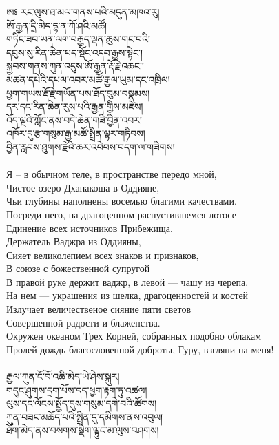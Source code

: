\ti
ཨཿ རང་ལུས་ཐ་མལ་གནས་པའི་མདུན་མཁའ་རུ།\\
ཨོ་རྒྱན་དྲི་མེད་དྷ་ན་ཀོ་ཤའི་མཚོ།\\
གཏིང་ཟབ་ཡན་ལག་བརྒྱད་ལྡན་ཆུས་གང་བའི།\\
དབུས་སུ་རིན་ཆེན་པད་སྡོང་འདབ་རྒྱས་སྟེང་།\\
སྐྱབས་གནས་ཀུན་འདུས་ཨོ་རྒྱན་རྡོ་རྗེ་འཆང་།\\
མཚན་དཔེའི་དཔལ་འབར་མཚོ་རྒྱལ་ཡུམ་དང་འཁྲིལ།\\
ཕྱག་གཡས་རྡོ་རྗེ་གཡོན་པས་ཐོད་བུམ་བསྣམས།\\
དར་དང་རིན་ཆེན་རུས་པའི་རྒྱན་གྱིས་མཛེས།\\
འོད་ལྔའི་ཀློང་ནས་བདེ་ཆེན་གཟི་བྱིན་འབར། \\
འཁོར་དུ་རྩ་གསུམ་རྒྱ་མཚོ་སྤྲིན་ལྟར་གཏིབས།\\
བྱིན་རླབས་ཐུགས་རྗེའི་ཆར་འབེབས་བདག་ལ་གཟིགས། \\
\\
\ru
Я – в обычном теле, в пространстве передо мной,\\
Чистое озеро Дханакоша в Оддияне, \\
Чьи глубины наполнены восемью благими качествами. \\
Посреди него, на драгоценном распустившемся лотосе — \\
Единение всех источников Прибежища, \\
Держатель Ваджра из Оддияны, \\
Сияет великолепием всех знаков и признаков, \\
В союзе с божественной супругой \\
В правой руке держит ваджр, в левой — чашу из черепа. \\
На нем — украшения из шелка, драгоценностей и костей \\
Излучает величественое сияние пяти светов \\
Совершенной радости и блаженства. \\
Окружен океаном Трех Корней, собранных подобно облакам \\
Пролей дождь благословенной доброты, Гуру, взгляни на меня! \\
\newpage
\\
\ti
རྒྱལ་ཀུན་ངོ་བོ་འཆི་མེད་ཡེ་ཤེས་སྐུར།\\
གདུང་ཤུགས་དྲག་པོས་དད་ཕྱག་རྟག་ཏུ་འཚལ།\\
ལུས་དང་ལོངས་སྤྱོད་དུས་གསུམ་དགེ་བའི་ཚོགས།\\
ཀུན་བཟང་མཆོད་པའི་སྤྲིན་དུ་དམིགས་ནས་འབུལ། \\
ཐོག་མེད་ནས་བསགས་སྡིག་ལྟུང་མ་ལུས་བཤགས།\\
